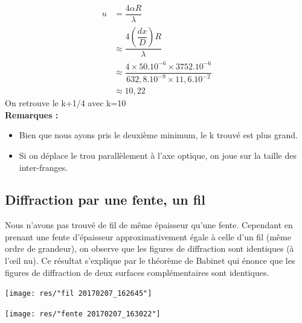 \documentclass[12pt,a4paper]{article}
\begin{document}
	\bgroup
	\addtolength{\jot}{4pt}
	\begin{align*}
	u&=\dfrac{4\alpha R}{\lambda}\\
	&\approx\dfrac{4 \left(\dfrac{dx}{D}\right) R }{\lambda}\\
	&\approx\dfrac{4\times50.10^{-6}\times3752.10^{-6}}{632,8.10^{-9}\times11,6.10^{-2}}\\
	&\approx10,22
	\end{align*}
	\egroup
	On retrouve le k+1/4 avec k=10\\
	\textbf{Remarques :}
	\begin{itemize}
		\item  Bien que nous ayons pris le deuxième minimum, le k trouvé est plus grand.
		\item  Si on déplace le trou parallèlement à l'axe optique, on joue sur la taille des inter-franges.
	\end{itemize}
	\subsection{Diffraction par une fente, un fil}
	Nous n'avons pas trouvé de fil de même épaisseur qu'une fente. Cependant en prenant une fente d'épaisseur approximativement égale à celle d'un fil (même ordre de grandeur), on observe que les figures de diffraction sont identiques (à l'œil nu).
	Ce résultat s'explique par le théorème de Babinet qui énonce que les figures de diffraction de deux surfaces complémentaires sont identiques.\\
	\begin{bigcenter}
		\begin{multicols}{2}
			\bgroup
			\texttt{[image: res/"fil 20170207\_162645"]}
			\egroup
			
			\columnbreak
			\vfill
			\bgroup
			\texttt{[image: res/"fente 20170207\_163022"]}
			\egroup
		\end{multicols}
	\end{bigcenter}
	
\end{document}

